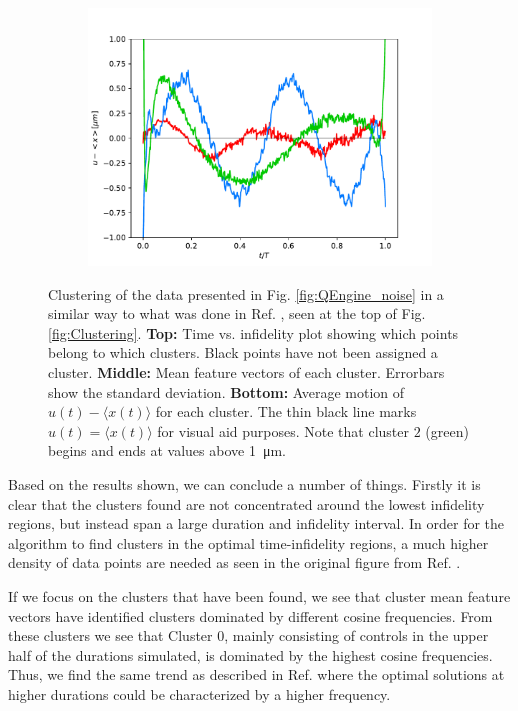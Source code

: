 \documentclass[a4paper, twocolumn]{revtex4-1}
\begin{document}
\begin{figure}
\begin{subfigure}{\columnwidth}
		\includegraphics[width=\columnwidth]{graphics/qengine/QEclustering-means.pdf}
	\end{subfigure}
	\caption{Clustering of the data presented in Fig. \ref{fig:QEngine_noise} in a similar way to what was done in Ref. \cite{QM2Paper}, seen at the top of Fig. \ref{fig:Clustering}. \textbf{Top:} Time vs. infidelity plot showing which points belong to which clusters. Black points have not been assigned a cluster. \textbf{Middle:} Mean feature vectors of each cluster. Errorbars show the standard deviation. \textbf{Bottom:} Average motion of $u(t)-\langle x(t) \rangle$ for each cluster. The thin black line marks $u(t)=\langle x(t) \rangle$ for visual aid purposes. Note that cluster $2$ (green) begins and ends at values above \SI{1}{\micro\meter}.}
	\label{fig:QEngineClustering}
\end{figure}

Based on the results shown, we can conclude a number of things. Firstly it is clear that the clusters found are not concentrated around the lowest infidelity regions, but instead span a large duration and infidelity interval. In order for the algorithm to find clusters in the optimal time-infidelity regions, a much higher density of data points are needed as seen in the original figure from Ref. \cite{QM2Paper}. 

If we focus on the clusters that have been found, we see that cluster mean feature vectors have identified clusters dominated by different cosine frequencies. From these clusters we see that Cluster 0, mainly consisting of controls in the upper half of the durations simulated, is dominated by the highest cosine frequencies. Thus, we find the same trend as described in Ref. \cite{QM2Paper} where the optimal solutions at higher durations could be characterized by a higher frequency.
\end{document}
